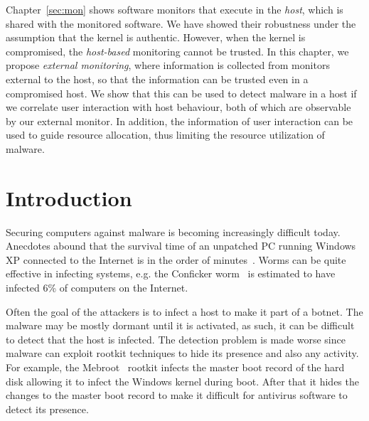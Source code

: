 
Chapter~\ref{sec:mon} shows software monitors that execute in the {\em host},
which is shared with the monitored software.
We have showed their robustness under the assumption that the kernel is
authentic.
However, when the kernel is compromised, the {\em host-based} monitoring
cannot be trusted.
In this chapter,
we propose {\em external monitoring}, where information is collected from
monitors external to the host, so that the information can be trusted
even in a compromised host.
We show that this can be used to detect malware in a host if
we correlate user interaction with host behaviour,
both of which are observable by our external monitor.
In addition, the information of user interaction can be used to guide
resource allocation, thus limiting the resource utilization of malware.

\section{Introduction}

Securing computers against malware is becoming increasingly difficult today.
Anecdotes abound that the survival time
of an unpatched PC running Windows XP connected to the Internet 
is in the order of minutes~\cite{Survival1,Survival2}.
Worms can be quite effective in infecting systems, e.g.
the Conficker worm~\cite{conficker6}
is estimated to have infected 6\% of computers on the Internet.

Often the goal of the attackers is to infect a host to make it part
of a botnet.
The malware may be mostly dormant until it is activated,
as such, it can be difficult to detect that the host is infected.
The detection problem is made worse since malware can exploit rootkit
techniques to hide its presence and also any activity.
For example, the Mebroot~\cite{Mebroot} rootkit infects the master boot record of the
hard disk allowing it to infect the Windows kernel during boot.
After that it hides the changes to the master boot record to make it
difficult for antivirus software to detect its presence.

